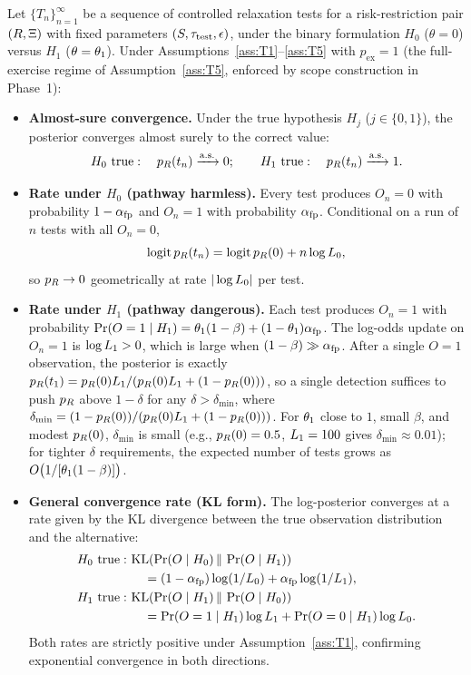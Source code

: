 \begin{theorem}
\label{thm:convergence}
Let $\{T_n\}_{n=1}^{\infty}$ be a sequence of controlled
relaxation tests for a risk-restriction pair
$(R, \Xi)$ with fixed parameters
$(S, \tau_{\mathrm{test}}, \epsilon)$, under the binary formulation
$H_0$ ($\theta = 0$) versus $H_1$ ($\theta = \theta_1$).  Under
Assumptions~\ref{ass:T1}--\ref{ass:T5} with
$p_{\mathrm{ex}} = 1$ (the full-exercise regime of
Assumption~\ref{ass:T5}, enforced by scope construction in
Phase~1):
\begin{itemize}
\item[(a)] \textbf{Almost-sure convergence.}  Under the true
  hypothesis $H_j$ ($j \in \{0, 1\}$), the posterior converges
  almost surely to the correct value:
  $$
  H_0 \text{ true}: \quad p_R(t_n) \xrightarrow{\mathrm{a.s.}} 0;
  \qquad
  H_1 \text{ true}: \quad p_R(t_n) \xrightarrow{\mathrm{a.s.}} 1.
  $$
\item[(b)] \textbf{Rate under $H_0$ (pathway harmless).}  Every
  test produces $O_n = 0$ with probability $1 - \alpha_{\mathrm{fp}}$ and
  $O_n = 1$ with probability $\alpha_{\mathrm{fp}}$.  Conditional on a
  run of $n$ tests with all $O_n = 0$,
  $$
  \operatorname{logit} p_R(t_n) = \operatorname{logit} p_R(0) + n \log L_0,
  $$
  so $p_R \to 0$ geometrically at rate $|\log L_0|$ per test.
\item[(c)] \textbf{Rate under $H_1$ (pathway dangerous).}  Each
  test produces $O_n = 1$ with probability
  $\Pr(O = 1 \mid H_1) = \theta_1 (1 - \beta)
    + (1 - \theta_1) \alpha_{\mathrm{fp}}$.  The log-odds update on
  $O_n = 1$ is $\log L_1 > 0$, which is large when
  $(1 - \beta) \gg \alpha_{\mathrm{fp}}$.  After a single $O = 1$
  observation, the posterior is exactly
  $p_R(t_1) = p_R(0) L_1 / (p_R(0) L_1 + (1 - p_R(0)))$,
  so a single detection suffices to push $p_R$ above $1 - \delta$
  for any $\delta > \delta_{\min}$, where
  $\delta_{\min} = (1 - p_R(0)) / (p_R(0) L_1 + (1 - p_R(0)))$.
  For $\theta_1$ close to $1$, small $\beta$, and modest
  $p_R(0)$, $\delta_{\min}$ is small (e.g.,
  $p_R(0) = 0.5$, $L_1 = 100$ gives $\delta_{\min} \approx
  0.01$); for tighter $\delta$ requirements, the expected number
  of tests grows as $O\bigl(1 / [\theta_1 (1 - \beta)]\bigr)$.
\item[(d)] \textbf{General convergence rate (KL form).}  The
  log-posterior converges at a rate given by the KL divergence
  between the true observation distribution and the alternative:
  \begin{align*}
  H_0 \text{ true}: \
    &\mathrm{KL}(\Pr(O \mid H_0) \,\|\, \Pr(O \mid H_1)) \\
    &\quad = (1 - \alpha_{\mathrm{fp}}) \log(1/L_0)
       + \alpha_{\mathrm{fp}} \log(1/L_1), \\
  H_1 \text{ true}: \
    &\mathrm{KL}(\Pr(O \mid H_1) \,\|\, \Pr(O \mid H_0)) \\
    &\quad = \Pr(O = 1 \mid H_1) \log L_1
       + \Pr(O = 0 \mid H_1) \log L_0.
  \end{align*}
  Both rates are strictly positive under
  Assumption~\ref{ass:T1}, confirming exponential convergence
  in both directions.
\end{itemize}
\end{theorem}

